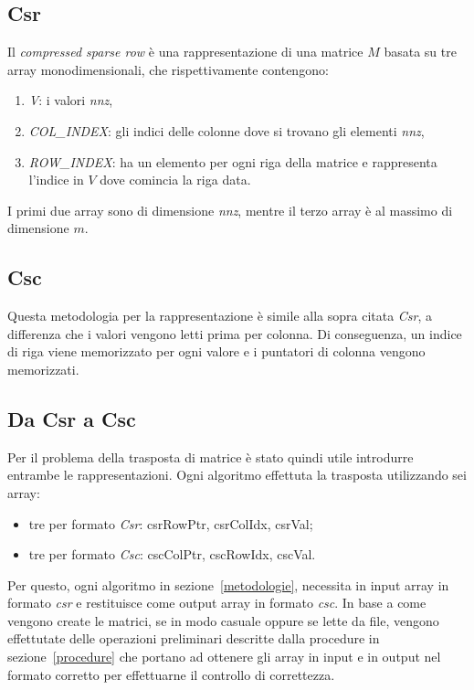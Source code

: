 \documentclass[]{IEEEtran}
\begin{document}
	\subsection{Csr}
	\label{csr}
	Il \textit{compressed sparse row} è una rappresentazione di una matrice $ M $ basata su tre array monodimensionali, che rispettivamente contengono:
	\begin{enumerate}
		\item \textit{V}: i valori \textit{nnz},
		\item \textit{COL\_INDEX}: gli indici delle colonne dove si trovano gli elementi \textit{nnz},
		\item \textit{ROW\_INDEX}: ha un elemento per ogni riga della matrice e rappresenta l'indice in $ V $ dove comincia la riga data.
	\end{enumerate}
	I primi due array sono di dimensione \textit{nnz}, mentre il terzo array è al massimo di dimensione $ m $.
	
	\subsection{Csc}
	\label{csc}
 	Questa metodologia per la rappresentazione è simile alla sopra citata \textit{Csr}, a differenza che i valori vengono letti prima per colonna. Di conseguenza, un indice di riga viene memorizzato per ogni valore e i puntatori di colonna vengono memorizzati.
 	
	\subsection{Da Csr a Csc}
	\label{csr-to-csc}
 	Per il problema della trasposta di matrice è stato quindi utile introdurre entrambe le rappresentazioni. Ogni algoritmo effettuta la trasposta utilizzando sei array:
 	\begin{itemize}
 		\item tre per formato \textit{Csr}: csrRowPtr, csrColIdx, csrVal;
 		\item tre per formato \textit{Csc}: cscColPtr, cscRowIdx, cscVal.	
 	\end{itemize} 
	Per questo, ogni algoritmo in sezione~\ref{metodologie}, necessita in input array in formato \textit{csr} e restituisce come output array in formato \textit{csc}.\newline
 	In base a come vengono create le matrici, se in modo casuale oppure se lette da file, vengono effettutate delle operazioni preliminari descritte dalla procedure in sezione~\ref{procedure} che portano ad ottenere gli array in input e in output nel formato corretto per effettuarne il controllo di correttezza.\newline
	
\end{document}
